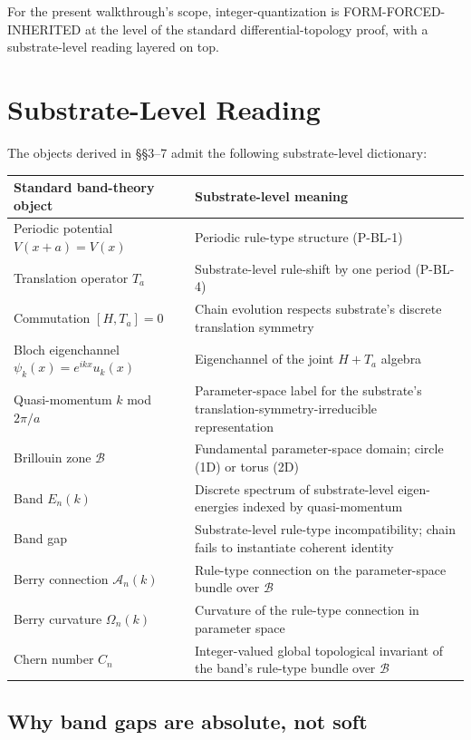 \documentclass[11pt,a4paper]{article}
\begin{document}
For the present walkthrough's scope, integer-quantization is FORM-FORCED-INHERITED at the level of the standard differential-topology proof, with a substrate-level reading layered on top.

\section{Substrate-Level Reading}

The objects derived in \S\S3--7 admit the following substrate-level dictionary:

\begin{center}
\small
\begin{tabular}{@{}p{5cm}p{9cm}@{}}
\toprule
Standard band-theory object & Substrate-level meaning \\
\midrule
Periodic potential $V(x+a) = V(x)$ & Periodic rule-type structure (P-BL-1) \\
Translation operator $T_a$ & Substrate-level rule-shift by one period (P-BL-4) \\
Commutation $[H, T_a] = 0$ & Chain evolution respects substrate's discrete translation symmetry \\
Bloch eigenchannel $\psi_k(x) = e^{ikx}u_k(x)$ & Eigenchannel of the joint $H{+}T_a$ algebra \\
Quasi-momentum $k$ mod $2\pi/a$ & Parameter-space label for the substrate's translation-symmetry-irreducible representation \\
Brillouin zone $\mathcal{B}$ & Fundamental parameter-space domain; circle (1D) or torus (2D) \\
Band $E_n(k)$ & Discrete spectrum of substrate-level eigen-energies indexed by quasi-momentum \\
Band gap & Substrate-level rule-type incompatibility; chain fails to instantiate coherent identity \\
Berry connection $\mathcal{A}_n(k)$ & Rule-type connection on the parameter-space bundle over $\mathcal{B}$ \\
Berry curvature $\Omega_n(k)$ & Curvature of the rule-type connection in parameter space \\
Chern number $C_n$ & Integer-valued global topological invariant of the band's rule-type bundle over $\mathcal{B}$ \\
\bottomrule
\end{tabular}
\end{center}

\subsection{Why band gaps are absolute, not soft}
\end{document}

